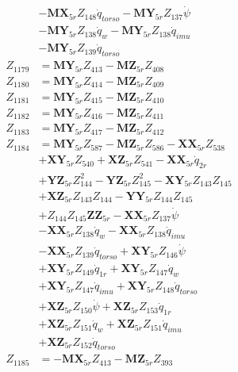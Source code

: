 \begin{multicols}{2}
\begin{align}
&- \mathbf{MX}_{5r}Z_{148}\dot{q}_{torso} - \mathbf{MY}_{5r}Z_{137}\dot{\psi}  \nonumber \\
&- \mathbf{MY}_{5r}Z_{138}\dot{q}_{w} - \mathbf{MY}_{5r}Z_{138}\dot{q}_{imu}  \nonumber \\
&- \mathbf{MY}_{5r}Z_{139}\dot{q}_{torso} \nonumber \\
Z_{1179} &= \mathbf{MY}_{5r}Z_{413} - \mathbf{MZ}_{5r}Z_{408} \nonumber \\
Z_{1180} &= \mathbf{MY}_{5r}Z_{414} - \mathbf{MZ}_{5r}Z_{409} \nonumber \\
Z_{1181} &= \mathbf{MY}_{5r}Z_{415} - \mathbf{MZ}_{5r}Z_{410} \nonumber \\
Z_{1182} &= \mathbf{MY}_{5r}Z_{416} - \mathbf{MZ}_{5r}Z_{411} \nonumber \\
Z_{1183} &= \mathbf{MY}_{5r}Z_{417} - \mathbf{MZ}_{5r}Z_{412} \nonumber \\
Z_{1184} &= \mathbf{MY}_{5r}Z_{587} - \mathbf{MZ}_{5r}Z_{586} - \mathbf{XX}_{5r}Z_{538}  \nonumber \\
&+ \mathbf{XY}_{5r}Z_{540} + \mathbf{XZ}_{5r}Z_{541} - \mathbf{XX}_{5r}\dot{q}_{2r}  \nonumber \\
&+ \mathbf{YZ}_{5r}Z_{144}^2 - \mathbf{YZ}_{5r}Z_{145}^2 - \mathbf{XY}_{5r}Z_{143}Z_{145}  \nonumber \\
&+ \mathbf{XZ}_{5r}Z_{143}Z_{144} - \mathbf{YY}_{5r}Z_{144}Z_{145}  \nonumber \\
&+ Z_{144}Z_{145}\mathbf{ZZ}_{5r} - \mathbf{XX}_{5r}Z_{137}\dot{\psi}  \nonumber \\
&- \mathbf{XX}_{5r}Z_{138}\dot{q}_{w} - \mathbf{XX}_{5r}Z_{138}\dot{q}_{imu}  \nonumber \\
&- \mathbf{XX}_{5r}Z_{139}\dot{q}_{torso} + \mathbf{XY}_{5r}Z_{146}\dot{\psi}  \nonumber \\
&+ \mathbf{XY}_{5r}Z_{149}\dot{q}_{1r} + \mathbf{XY}_{5r}Z_{147}\dot{q}_{w}  \nonumber \\
&+ \mathbf{XY}_{5r}Z_{147}\dot{q}_{imu} + \mathbf{XY}_{5r}Z_{148}\dot{q}_{torso}  \nonumber \\
&+ \mathbf{XZ}_{5r}Z_{150}\dot{\psi} + \mathbf{XZ}_{5r}Z_{153}\dot{q}_{1r}  \nonumber \\
&+ \mathbf{XZ}_{5r}Z_{151}\dot{q}_{w} + \mathbf{XZ}_{5r}Z_{151}\dot{q}_{imu}  \nonumber \\
&+ \mathbf{XZ}_{5r}Z_{152}\dot{q}_{torso} \nonumber \\
Z_{1185} &= - \mathbf{MX}_{5r}Z_{413} - \mathbf{MZ}_{5r}Z_{393} \nonumber \\

\end{align}
\end{multicols}
